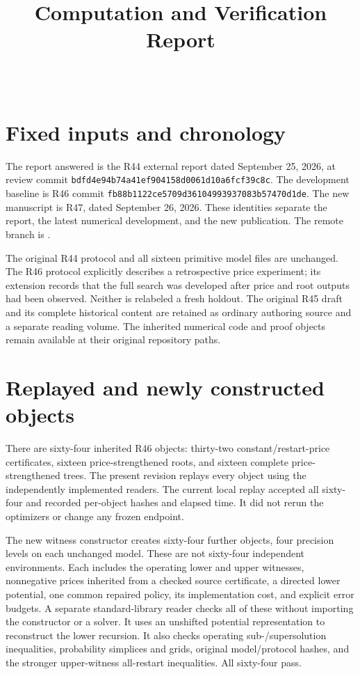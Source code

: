
\begin{frontmatter}\title{Computation and Verification Report}\begin{aug}\author[id=au1,addressref={add1}]{~}\address[id=add1]{}\end{aug}\end{frontmatter}
\section{Fixed inputs and chronology}
The report answered is the R44 external report dated September 25, 2026, at review commit \texttt{bdfd4e94b74a41ef904158d0061d10a6fcf39c8c}. The development baseline is R46 commit \texttt{fb88b1122ce5709d36104993937083b57470d1de}. The new manuscript is R47, dated September 26, 2026. These identities separate the report, the latest numerical development, and the new publication. The remote branch is .

The original R44 protocol and all sixteen primitive model files are unchanged. The R46 protocol explicitly describes a retrospective price experiment; its extension records that the full search was developed after price and root outputs had been observed. Neither is relabeled a fresh holdout. The original R45 draft and its complete historical content are retained as ordinary authoring source and a separate reading volume. The inherited numerical code and proof objects remain available at their original repository paths.

\section{Replayed and newly constructed objects}
There are sixty-four inherited R46 objects: thirty-two constant/restart-price certificates, sixteen price-strengthened roots, and sixteen complete price-strengthened trees. The present revision replays every object using the independently implemented readers. The current local replay accepted all sixty-four and recorded per-object hashes and elapsed time. It did not rerun the optimizers or change any frozen endpoint.

The new witness constructor creates sixty-four further objects, four precision levels on each unchanged model. These are not sixty-four independent environments. Each includes the operating lower and upper witnesses, nonnegative prices inherited from a checked source certificate, a directed lower potential, one common repaired policy, its implementation cost, and explicit error budgets. A separate standard-library reader checks all of these without importing the constructor or a solver. It uses an unshifted potential representation to reconstruct the lower recursion. It also checks operating sub-/supersolution inequalities, probability simplices and grids, original model/protocol hashes, and the stronger upper-witness all-restart inequalities. All sixty-four pass.

